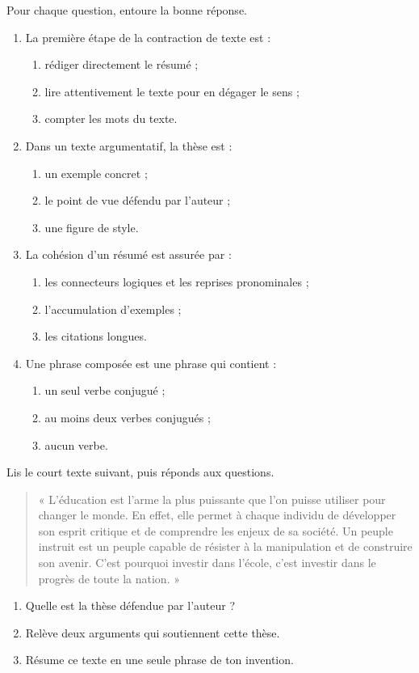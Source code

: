 \documentclass[11pt]{article}
\begin{document}
\begin{exercice}[QCM]
Pour chaque question, entoure la bonne réponse.
\begin{enumerate}
  \item La première étape de la contraction de texte est :
  \begin{enumerate}
    \item rédiger directement le résumé ;
    \item lire attentivement le texte pour en dégager le sens ;
    \item compter les mots du texte.
  \end{enumerate}
  \item Dans un texte argumentatif, la thèse est :
  \begin{enumerate}
    \item un exemple concret ;
    \item le point de vue défendu par l'auteur ;
    \item une figure de style.
  \end{enumerate}
  \item La cohésion d'un résumé est assurée par :
  \begin{enumerate}
    \item les connecteurs logiques et les reprises pronominales ;
    \item l'accumulation d'exemples ;
    \item les citations longues.
  \end{enumerate}
  \item Une phrase composée est une phrase qui contient :
  \begin{enumerate}
    \item un seul verbe conjugué ;
    \item au moins deux verbes conjugués ;
    \item aucun verbe.
  \end{enumerate}
\end{enumerate}
\end{exercice}

\begin{exercice}
Lis le court texte suivant, puis réponds aux questions.

\begin{quote}
« L'éducation est l'arme la plus puissante que l'on puisse utiliser pour changer le monde. En effet, elle permet à chaque individu de développer son esprit critique et de comprendre les enjeux de sa société. Un peuple instruit est un peuple capable de résister à la manipulation et de construire son avenir. C'est pourquoi investir dans l'école, c'est investir dans le progrès de toute la nation. »
\end{quote}

\begin{enumerate}
  \item Quelle est la thèse défendue par l'auteur ?
  \item Relève deux arguments qui soutiennent cette thèse.
  \item Résume ce texte en une seule phrase de ton invention.
\end{enumerate}
\end{exercice}
\end{document}
